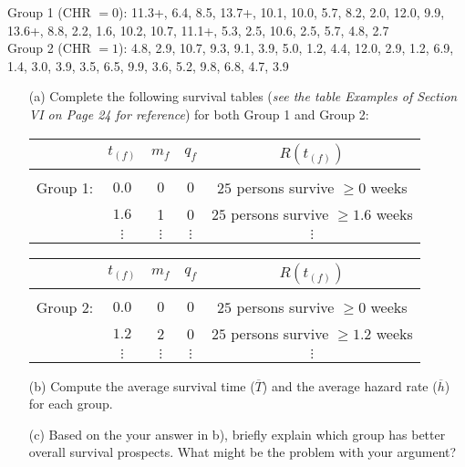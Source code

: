 \documentclass[12pt]{article}
\begin{document}
Group 1 (CHR $= 0$): 11.3+, 6.4, 8.5, 13.7+, 10.1, 10.0, 5.7, 8.2, 2.0, 12.0, 9.9, 13.6+, 8.8, 2.2, 1.6, 10.2, 10.7, 11.1+, 5.3, 2.5, 10.6, 2.5, 5.7, 4.8, 2.7 \\

Group 2 (CHR $= 1$): 4.8, 2.9, 10.7, 9.3, 9.1, 3.9, 5.0, 1.2, 4.4, 12.0, 2.9, 1.2, 6.9, 1.4, 3.0, 3.9, 3.5, 6.5, 9.9, 3.6, 5.2, 9.8, 6.8, 4.7, 3.9 \\

\begin{itemize}
	\item[(a)] Complete the following survival tables (\textit{see the table Examples of Section VI on Page 24 for reference}) for both Group 1 and Group 2: \\

\begin{center}
\begin{tabular}{ c c c c c }
 & $t_{(f)}$ & $m_{f}$ & $q_{f}$ & $R(t_{(f)})$ \\
 \hline \\
 Group 1: & $0.0$ & $0$ & $0$ & $25$ persons survive $\geq 0$ weeks \\
 & $1.6$ &1  &0  & $25$ persons survive $\geq 1.6$ weeks \\
 & $\vdots$ & $\vdots$ & $\vdots$ & $\vdots$
\end{tabular}
\end{center}

\begin{center}
\begin{tabular}{ c c c c c }
 & $t_{(f)}$ & $m_{f}$ & $q_{f}$ & $R(t_{(f)})$ \\
 \hline \\
 Group 2: & $0.0$ & $0$ & $0$ & $25$ persons survive $\geq 0$ weeks \\
 & $1.2$ &2  &0  & $25$ persons survive $\geq 1.2$ weeks \\
 & $\vdots$ & $\vdots$ & $\vdots$ & $\vdots$
\end{tabular}
\end{center}

	
	\item[(b)] Compute the average survival time ($\overline{T}$) and the average hazard rate ($\overline{h}$) for each group.
	
	\item[(c)] Based on the your answer in b), briefly explain which group has better overall survival prospects. What might be the problem with your argument?
\end{itemize}
\end{document}
